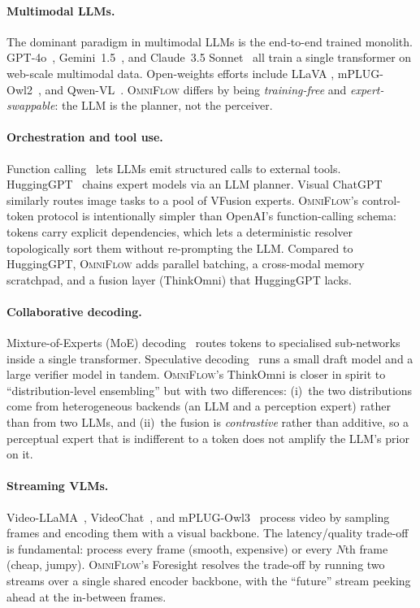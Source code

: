 \documentclass[11pt,a4paper]{article}
\newcommand{\OmniFlow}{\textsc{OmniFlow}}
\begin{document}
\paragraph{Multimodal LLMs.}
The dominant paradigm in multimodal LLMs is the end-to-end trained
monolith. GPT-4o~\cite{openai2024gpt4o},
Gemini~1.5~\cite{google2024gemini}, and Claude~3.5
Sonnet~\cite{anthropic2024claude} all train a single transformer on
web-scale multimodal data. Open-weights efforts include LLaVA
\cite{liu2023llava}, mPLUG-Owl2~\cite{ye2024mplugowl2}, and
Qwen-VL~\cite{bai2023qwenvl}. \OmniFlow{} differs by being
\emph{training-free} and \emph{expert-swappable}: the LLM is the
planner, not the perceiver.

\paragraph{Orchestration and tool use.}
Function calling~\cite{openai2023funccall,schick2023tool} lets LLMs emit
structured calls to external tools. HuggingGPT~\cite{shen2023hugginggpt}
chains expert models via an LLM planner. Visual
ChatGPT~\cite{wu2023visualchatgpt} similarly routes image tasks to a
pool of VFusion experts. \OmniFlow's control-token protocol is
intentionally simpler than OpenAI's function-calling schema: tokens
carry explicit dependencies, which lets a deterministic resolver
topologically sort them without re-prompting the LLM. Compared to
HuggingGPT, \OmniFlow{} adds parallel batching, a cross-modal memory
scratchpad, and a fusion layer (ThinkOmni) that HuggingGPT lacks.

\paragraph{Collaborative decoding.}
Mixture-of-Experts (MoE) decoding~\cite{shazeer2017moe,fedus2022switch}
routes tokens to specialised sub-networks inside a single transformer.
Speculative decoding~\cite{leviathan2023speculative,chen2023speculative}
runs a small draft model and a large verifier model in tandem.
\OmniFlow's ThinkOmni is closer in spirit to ``distribution-level
ensembling'' but with two differences: (i)~the two distributions come
from heterogeneous backends (an LLM and a perception expert) rather
than from two LLMs, and (ii)~the fusion is \emph{contrastive} rather
than additive, so a perceptual expert that is indifferent to a token
does not amplify the LLM's prior on it.

\paragraph{Streaming VLMs.}
Video-LLaMA~\cite{zhang2023videollama}, VideoChat~\cite{li2023videochat},
and mPLUG-Owl3~\cite{ye2024mplugowl3} process video by sampling frames
and encoding them with a visual backbone. The latency/quality trade-off
is fundamental: process every frame (smooth, expensive) or every $N$th
frame (cheap, jumpy). \OmniFlow's Foresight resolves the trade-off by
running two streams over a single shared encoder backbone, with the
``future'' stream peeking ahead at the in-between frames.
\end{document}
